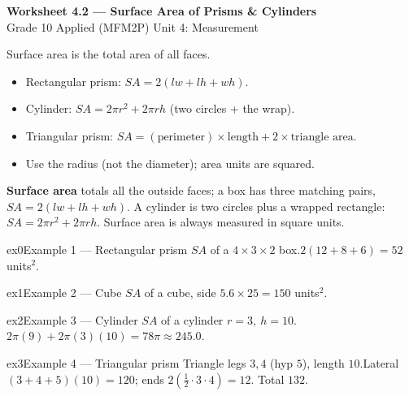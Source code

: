 \documentclass[11pt]{article}
\begin{document}
\begin{center}
{\LARGE\bfseries\color{titleblue}Worksheet 4.2 --- Surface Area of Prisms \& Cylinders}\\[2pt]
{\small Grade 10 Applied (MFM2P) \textperiodcentered{} Unit 4: Measurement}
\end{center}

\begin{ideabox}
Surface area is the total area of all faces.
\begin{itemize}[leftmargin=*,itemsep=2pt]
  \item Rectangular prism: $SA=2(lw+lh+wh)$.
  \item Cylinder: $SA=2\pi r^2+2\pi rh$ (two circles + the wrap).
  \item Triangular prism: $SA=(\text{perimeter})\times\text{length}+2\times\text{triangle area}$.
  \item Use the radius (not the diameter); area units are squared.
\end{itemize}
\end{ideabox}

\begin{learnbox}
\textbf{Surface area} totals all the outside faces; a box has three matching pairs, $SA=2(lw+lh+wh)$.
A cylinder is two circles plus a wrapped rectangle: $SA=2\pi r^2+2\pi rh$.
Surface area is always measured in square units.
\end{learnbox}


\begin{example}{ex0}{Example 1 --- Rectangular prism}
$SA$ of a $4\times3\times2$ box.\soln $2(12+8+6)=52$ units$^2$.
\end{example}

\begin{example}{ex1}{Example 2 --- Cube}
$SA$ of a cube, side $5$.\soln $6\times25=150$ units$^2$.
\end{example}

\begin{example}{ex2}{Example 3 --- Cylinder}
$SA$ of a cylinder $r=3,\ h=10$.\soln $2\pi(9)+2\pi(3)(10)=78\pi\approx245.0$.
\end{example}

\begin{example}{ex3}{Example 4 --- Triangular prism}
Triangle legs $3,4$ (hyp $5$), length $10$.\soln Lateral $(3+4+5)(10)=120$; ends $2(\tfrac12\cdot3\cdot4)=12$. Total $132$.
\end{example}
\end{document}
